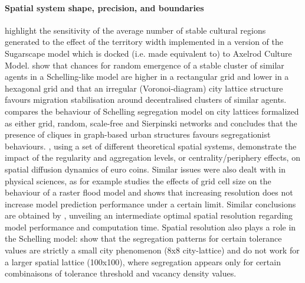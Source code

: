 \documentclass[preprint,5p,times,twocolumn,authoryear]{elsarticle}
\begin{document}
\paragraph{Spatial system shape, precision, and boundaries} \citet{Axtelletal1996} highlight the sensitivity of the average number of stable cultural regions generated to the effect of the territory width implemented in a version of the Sugarscape model which is docked (i.e. made equivalent to) to Axelrod Culture Model. \citet{FlacheHegselmann2001} show that chances for random emergence of a stable cluster of similar agents in a Schelling-like model are higher in a rectangular grid and lower in a hexagonal grid and that an irregular (Voronoi-diagram) city lattice structure favours migration stabilisation around decentralised clusters of similar agents. \citet{Banos2012} compares the behaviour of Schelling segregation model on city lattices formalized as either grid, random, scale-free and Sierpinski networks and concludes that the presence of cliques in graph-based urban structures favours segregationist behaviours. \citet{LeTexierCaruso2017}, using a set of different theoretical spatial systems, demonstrate the impact of the regularity and aggregation levels, or centrality/periphery effects, on spatial diffusion dynamics of euro coins. Similar issues were also dealt with in physical sciences, as for example \cite{horritt2001effects} studies the effects of grid cell size on the behaviour of a raster flood model and shows that increasing resolution does not increase model prediction performance under a certain limit. Similar conclusions are obtained by \cite{vazquez2002effect}, unveiling an intermediate optimal spatial resolution regarding model performance and computation time. Spatial resolution also plays a role in the Schelling model: \citet{Singhetal2009} show that the segregation patterns for certain tolerance values are strictly a small city phenomenon (8x8 city-lattice) and do not work for a larger spatial lattice (100x100), where segregation appears only for certain combinaisons of tolerance threshold and vacancy density values.
\end{document}
